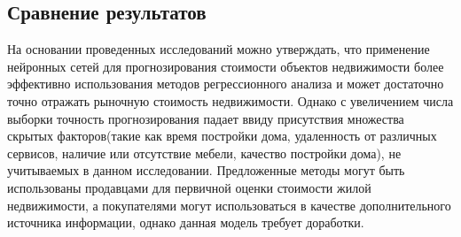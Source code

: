 \subsection{Сравнение результатов}
\label{sec:experiment:conclusion}

На основании проведенных исследований можно утверждать, что применение нейронных сетей для прогнозирования
стоимости объектов недвижимости более эффективно использования методов регрессионного анализа и может достаточно
точно отражать рыночную стоимость недвижимости. Однако с увеличением числа выборки точность прогнозирования падает ввиду
присутствия множества скрытых факторов(такие как время постройки дома, удаленность от различных сервисов, наличие или
отсутствие мебели, качество постройки дома), не учитываемых в данном исследовании.
Предложенные методы могут быть использованы продавцами для первичной оценки стоимости жилой недвижимости,
а покупателями могут использоваться в качестве дополнительного источника информации, однако данная модель требует
доработки.
